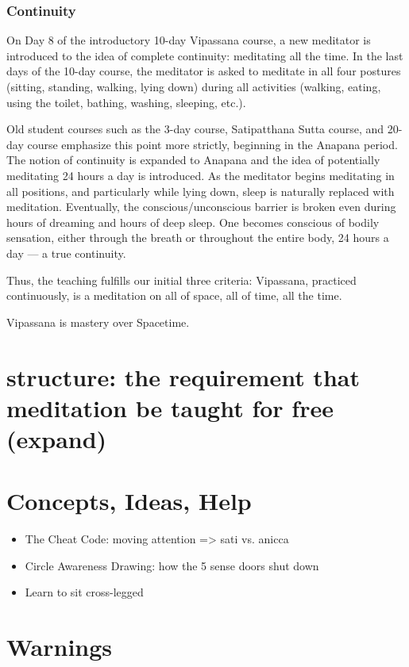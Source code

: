 \documentclass[a4paper, amsfonts, amssymb, amsmath, reprint, showkeys, nofootinbib, twoside]{revtex4-1}
\begin{document}
\subsubsection{Continuity}

On Day 8 of the introductory 10-day Vipassana course, a new meditator is introduced
to the idea of complete continuity: meditating all the time. In the last days of the
10-day course, the meditator is asked to meditate in all four postures (sitting,
standing, walking, lying down) during all activities (walking, eating, using the
toilet, bathing, washing, sleeping, etc.).

Old student courses such as the 3-day course, Satipatthana Sutta course, and 20-day
course emphasize this point more strictly, beginning in the Anapana period. The
notion of continuity is expanded to Anapana and the idea of potentially meditating 24
hours a day is introduced. As the meditator begins meditating in all positions, and
particularly while lying down, sleep is naturally replaced with
meditation. Eventually, the conscious/unconscious barrier is broken even during
hours of dreaming and hours of deep sleep. One becomes conscious of bodily sensation,
either through the breath or throughout the entire body, 24 hours a day --- a true
continuity.

Thus, the teaching fulfills our initial three criteria: Vipassana, practiced
continuously, is a meditation on all of space, all of time, all the time.

Vipassana is mastery over Spacetime.

\section{structure: the requirement that meditation be taught for free (expand)}


\section{Concepts, Ideas, Help}

\begin{itemize}
  \item The Cheat Code: moving attention => sati vs. anicca
  \item Circle Awareness Drawing: how the 5 sense doors shut down
  \item Learn to sit cross-legged
\end{itemize}


\section{Warnings}
\end{document}

